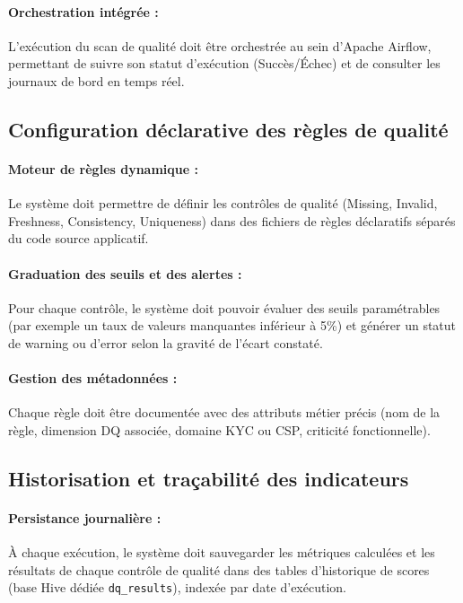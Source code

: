 \paragraph{Orchestration intégrée :} L'exécution du scan de qualité doit être orchestrée au sein d'Apache Airflow, permettant de suivre son statut d'exécution (Succès/Échec) et de consulter les journaux de bord en temps réel.

\subsection{Configuration déclarative des règles de qualité}
\paragraph{Moteur de règles dynamique :} Le système doit permettre de définir les contrôles de qualité (Missing, Invalid, Freshness, Consistency, Uniqueness) dans des fichiers de règles déclaratifs séparés du code source applicatif.

\paragraph{Graduation des seuils et des alertes :} Pour chaque contrôle, le système doit pouvoir évaluer des seuils paramétrables (par exemple un taux de valeurs manquantes inférieur à 5\%) et générer un statut de warning ou d'error selon la gravité de l'écart constaté.

\paragraph{Gestion des métadonnées :} Chaque règle doit être documentée avec des attributs métier précis (nom de la règle, dimension DQ associée, domaine KYC ou CSP, criticité fonctionnelle).

\subsection{Historisation et traçabilité des indicateurs}
\paragraph{Persistance journalière :} À chaque exécution, le système doit sauvegarder les métriques calculées et les résultats de chaque contrôle de qualité dans des tables d'historique de scores (base Hive dédiée \texttt{dq\_results}), indexée par date d'exécution.

